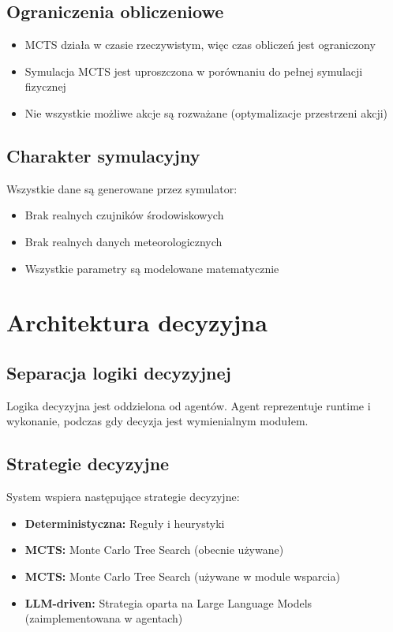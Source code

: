 \subsection{Ograniczenia obliczeniowe}

\begin{itemize}
    \item MCTS działa w czasie rzeczywistym, więc czas obliczeń jest ograniczony
    \item Symulacja MCTS jest uproszczona w porównaniu do pełnej symulacji fizycznej
    \item Nie wszystkie możliwe akcje są rozważane (optymalizacje przestrzeni akcji)
\end{itemize}

\subsection{Charakter symulacyjny}

Wszystkie dane są generowane przez symulator:
\begin{itemize}
    \item Brak realnych czujników środowiskowych
    \item Brak realnych danych meteorologicznych
    \item Wszystkie parametry są modelowane matematycznie
\end{itemize}

\section{Architektura decyzyjna}

\subsection{Separacja logiki decyzyjnej}

Logika decyzyjna jest oddzielona od agentów. Agent reprezentuje runtime i wykonanie, podczas gdy decyzja jest wymienialnym modułem.

\subsection{Strategie decyzyjne}

System wspiera następujące strategie decyzyjne:

\begin{itemize}
    \item \textbf{Deterministyczna:} Reguły i heurystyki
    \item \textbf{MCTS:} Monte Carlo Tree Search (obecnie używane)
    \item \textbf{MCTS:} Monte Carlo Tree Search (używane w module wsparcia)
    \item \textbf{LLM-driven:} Strategia oparta na Large Language Models (zaimplementowana w agentach)
\end{itemize}

